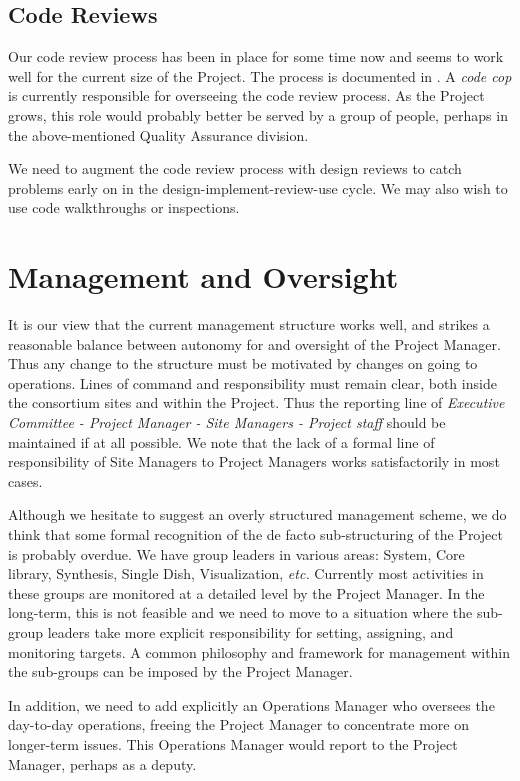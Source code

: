 \subsection{Code Reviews}

Our code review process has been in place for some time now and seems to work
well for the current size of the Project. The process is documented in 
.
A {\em code cop} is currently responsible for overseeing the code review
process. As the Project grows, this role would probably better be served
by a group of people, perhaps in the above-mentioned Quality Assurance division.

We need to augment the code review process with design reviews to catch
problems early on in the design-implement-review-use cycle. We may also
wish to use code walkthroughs or inspections.

\section{Management and Oversight}

It is our view that the current management structure works well, and
strikes a reasonable balance between autonomy for and oversight of the
Project Manager. Thus any change to the structure must be motivated by
changes on going to operations. Lines of command and responsibility
must remain clear, both inside the consortium sites and within the
Project. Thus the reporting line of {\em Executive Committee - Project
Manager - Site Managers - Project staff} should be maintained if at
all possible. We note that the lack of a formal line of responsibility
of Site Managers to Project Managers works satisfactorily in most cases.

Although we hesitate to suggest an overly structured management
scheme, we do think that some formal recognition of the de facto
sub-structuring of the Project is probably overdue. We have group
leaders in various areas: System, Core library, Synthesis, Single
Dish, Visualization, {\em etc.} Currently most activities in these
groups are monitored at a detailed level by the Project Manager. In
the long-term, this is not feasible and we need to move to a situation
where the sub-group leaders take more explicit responsibility for
setting, assigning, and monitoring targets. A common philosophy and
framework for management within the sub-groups can be imposed by the
Project Manager.

In addition, we need to add explicitly an Operations Manager
who oversees the day-to-day operations, freeing the Project Manager to
concentrate more on longer-term issues. This Operations Manager would
report to the Project Manager, perhaps as a deputy.

